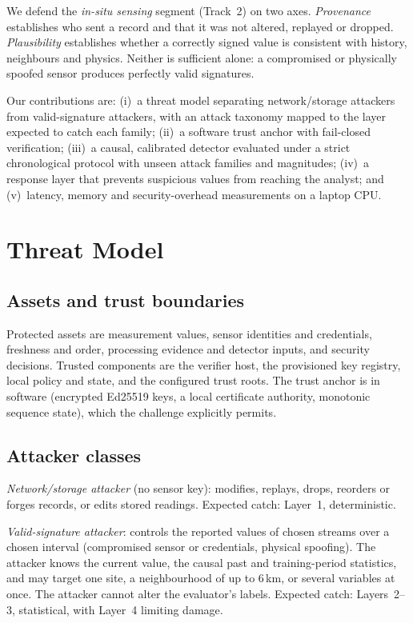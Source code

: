 \documentclass[conference]{IEEEtran}
\begin{document}
We defend the \emph{in-situ sensing} segment (Track~2) on two axes. \emph{Provenance} establishes who sent a
record and that it was not altered, replayed or dropped. \emph{Plausibility} establishes whether a correctly
signed value is consistent with history, neighbours and physics. Neither is sufficient alone: a compromised
or physically spoofed sensor produces perfectly valid signatures.

Our contributions are: (i)~a threat model separating network/storage attackers from valid-signature
attackers, with an attack taxonomy mapped to the layer expected to catch each family; (ii)~a software
trust anchor with fail-closed verification; (iii)~a causal, calibrated detector evaluated under a strict
chronological protocol with unseen attack families and magnitudes; (iv)~a response layer that prevents
suspicious values from reaching the analyst; and (v)~latency, memory and security-overhead measurements on
a laptop CPU.

\section{Threat Model}

\subsection{Assets and trust boundaries}
Protected assets are measurement values, sensor identities and credentials, freshness and order, processing
evidence and detector inputs, and security decisions. Trusted components are the verifier host, the
provisioned key registry, local policy and state, and the configured trust roots. The trust anchor is in
software (encrypted Ed25519 keys, a local certificate authority, monotonic sequence state), which the
challenge explicitly permits.

\subsection{Attacker classes}
\emph{Network/storage attacker} (no sensor key): modifies, replays, drops, reorders or forges records, or
edits stored readings. Expected catch: Layer~1, deterministic.

\emph{Valid-signature attacker}: controls the reported values of chosen streams over a chosen interval
(compromised sensor or credentials, physical spoofing). The attacker knows the current value, the causal past
and training-period statistics, and may target one site, a neighbourhood of up to 6\,km, or several variables
at once. The attacker cannot alter the evaluator's labels. Expected catch: Layers~2--3, statistical, with
Layer~4 limiting damage.
\end{document}
